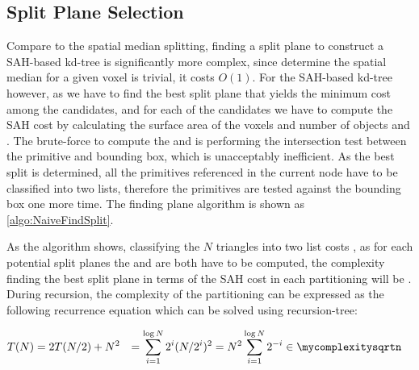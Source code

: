 \subsection{ \myNaive Split Plane Selection }
Compare to the spatial median splitting, finding a split plane to construct a SAH-based kd-tree is significantly more complex, since determine the spatial median for a given voxel is trivial, it costs \( O(1) \). For the SAH-based kd-tree however, as we have to find the best split plane that yields the minimum cost among the candidates, and for each of the candidates we have to compute the SAH cost by calculating the surface area of the voxels and number of objects \mynumtrileft and \mynumtriright. The brute-force to compute the \mynumtrileft and \mynumtriright is performing the intersection test between the primitive and bounding box, which is unacceptably inefficient. As the best split is determined, all the primitives referenced in the current node have to be classified into two lists, therefore the primitives are tested against the bounding box one more time. The \mynaive finding plane algorithm is shown as \ref{algo:NaiveFindSplit}. 

As the algorithm shows, classifying the \(N\) triangles into two list costs \mycomplexityn, as for each potential split planes the \mynumtrileft and \mynumtriright are both have to be computed, the complexity finding the best split plane in terms of the SAH cost in each partitioning will be \mycomplexitysqrtn. During recursion, the complexity of the partitioning can be expressed as the following recurrence equation which can be solved using recursion-tree: 

\begin{equation}
    \begin{split}
        T(N) &= 2T(N/2) + N^{2} &= \sum_{i=1}^{\log{N}}2^{i}(N/2^{i})^{2} &= N^{2}\sum_{i=1}^{\log{N}}2^{-i} \in \mycomplexitysqrtn
    \end{split}
\end{equation}

